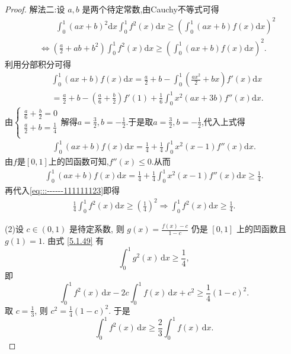 \documentclass[../../main.tex]{subfiles}
\begin{document}
\begin{proof}
{\color{blue}解法二:}设 \( a,b \) 是两个待定常数,由Cauchy不等式可得
\begin{align}
&\quad \quad \int_0^1{\left( ax+b \right) ^2\mathrm{d}x}\int_0^1{f^2\left( x \right) \mathrm{d}x}\geqslant \left( \int_0^1{\left( ax+b \right) f\left( x \right) \mathrm{d}x} \right) ^2\nonumber
\\
&\Longleftrightarrow \left( \frac{a}{2}+ab+b^2 \right) \int_0^1{f^2\left( x \right) \mathrm{d}x}\geqslant \left( \int_0^1{\left( ax+b \right) f\left( x \right) \mathrm{d}x} \right) ^2.\label{eq:::------111111123}
\end{align}
利用分部积分可得
\begin{align*}
&\int_0^1{\left( ax+b \right) f\left( x \right) \mathrm{d}x}=\frac{a}{2}+b-\int_0^1{\left( \frac{ax^2}{2}+bx \right) f' \left( x \right) \mathrm{d}x}
\\
&=\frac{a}{2}+b-\left( \frac{a}{6}+\frac{b}{2} \right) f'\left( 1 \right) +\frac{1}{6}\int_0^1{x^2\left( ax+3b \right) f'' \left( x \right) \mathrm{d}x}.
\end{align*}
由$\begin{cases}
\frac{a}{6}+\frac{b}{2}=0\\
\frac{a}{2}+b=\frac{1}{4}\\
\end{cases}$解得$a=\frac{3}{2},b=-\frac{1}{2}$.于是取$a=\frac{3}{2},b=-\frac{1}{2}$,代入上式得
\begin{align*}
\int_0^1{\left( ax+b \right) f\left( x \right) \mathrm{d}x}=\frac{1}{4}+\frac{1}{4}\int_0^1{x^2\left( x-1 \right) f'' \left( x \right) \mathrm{d}x}.
\end{align*}
由$f$是$[0,1]$上的凹函数可知,$f''(x)\leqslant 0.$从而
\begin{align*}
\int_0^1{\left( ax+b \right) f\left( x \right) \mathrm{d}x}=\frac{1}{4}+\frac{1}{4}\int_0^1{x^2\left( x-1 \right) f'' \left( x \right) \mathrm{d}x}\geqslant \frac{1}{4}.
\end{align*}
再代入\eqref{eq:::------111111123}即得
\begin{align*}
\frac{1}{4}\int_0^1{f^2\left( x \right) \mathrm{d}x}\geqslant \left( \frac{1}{4} \right) ^2\Longrightarrow \int_0^1{f^2\left( x \right) \mathrm{d}x}\geqslant \frac{1}{4}.
\end{align*}

(2)设 \( c \in (0,1) \) 是待定系数, 则 \( g(x) = \frac{f(x) - c}{1 - c} \) 仍是 \([0,1]\) 上的凹函数且 \( g(1) = 1 \). 由式 \eqref{5.1.49} 有
\[
\int_{0}^{1} g^2(x) \, \mathrm{d}x \geqslant \frac{1}{4},
\]
即
\[
\int_{0}^{1} f^2(x) \, \mathrm{d}x - 2c \int_{0}^{1} f(x) \, \mathrm{d}x + c^2 \geqslant \frac{1}{4}(1 - c)^2.
\]
取 \( c = \frac{1}{3} \), 则 \( c^2 = \frac{1}{4}(1 - c)^2 \). 于是
\[
\int_{0}^{1} f^2(x) \, \mathrm{d}x \geqslant \frac{2}{3} \int_{0}^{1} f(x) \, \mathrm{d}x.
\]

\end{proof}
\end{document}

